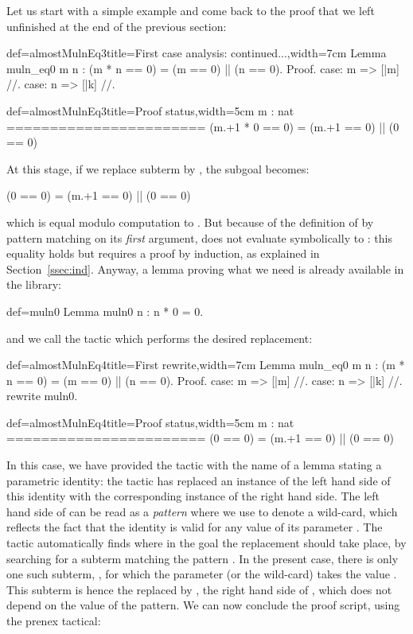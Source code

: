 Let us start with a simple example and come back to the proof that we
left unfinished at the end of the previous section:

\begin{coq}{def=almostMulnEq3}{title=First case analysis: continued...,width=7cm}
Lemma muln_eq0 m n :
  (m * n == 0) = (m == 0) || (n == 0).
Proof.
case: m => [|m] //.
case: n => [|k] //.
\end{coq}
\begin{coqout}{def=almostMulnEq3}{title=Proof status,width=5cm}
m : nat
=======================
(m.+1 * 0 == 0) =
(m.+1 == 0) || (0 == 0)
\end{coqout}
At this stage, if we replace subterm  by , the
subgoal becomes:

\begin{coqout}{}{}
(0 == 0) = (m.+1 == 0) || (0 == 0)
\end{coqout}
which is equal modulo computation to . But because of
the definition of  by pattern matching on its \emph{first}
argument,  does not evaluate symbolically to : this
equality holds but requires a proof by induction, as explained in
Section~\ref{ssec:ind}.
Anyway, a lemma proving what we need is already available in the library:

\begin{coq}{def=muln0}{}
Lemma muln0 n : n * 0 = 0.
\end{coq}
and we call the  tactic which performs the desired replacement:

\begin{coq}{def=almostMulnEq4}{title=First rewrite,width=7cm}
Lemma muln_eq0 m n :
  (m * n == 0) = (m == 0) || (n == 0).
Proof.
case: m => [|m] //.
case: n => [|k] //.
rewrite muln0.
\end{coq}
\begin{coqout}{def=almostMulnEq4}{title=Proof status,width=5cm}
m : nat
=======================
(0 == 0) =
(m.+1 == 0) || (0 == 0)
\end{coqout}

In this case, we have provided the  tactic with the name
 of a lemma stating a parametric identity: the tactic has
replaced an instance of the left hand side of this identity with the
corresponding instance of the right hand side. The left hand side of
 can be read as a \emph{pattern}  where we use \C{_}
to denote a wild-card, which reflects the fact that the identity is
valid for any value of its parameter . The tactic
automatically  finds  where in the goal the replacement should take
place, by searching for a subterm matching the pattern .
In the present case, there is only one such subterm,
, for which the parameter (or the wild-card) takes the
value . This subterm is hence the replaced by , the right
hand side of , which does not depend on the value of the
pattern. We can now conclude the proof script, using the
prenex  tactical:

